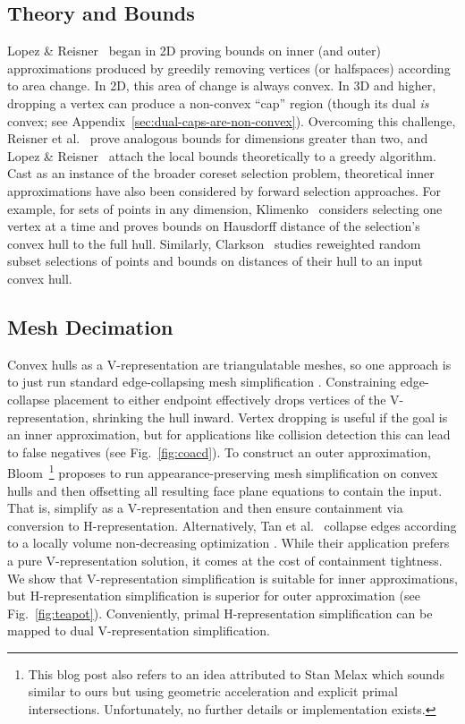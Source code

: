 \documentclass{egpubl}
\newcommand{\newhl}[1]{#1}
\newcommand{\Vrep}{V-representation\xspace}
\newcommand{\Hrep}{H-representation\xspace}
\begin{document}
\subsection{Theory and Bounds}
Lopez \& Reisner~\cite{LopezR00} began in 2D proving bounds on inner (and outer) approximations produced by greedily removing vertices (or halfspaces) according to area change.
In 2D, this area of change is always convex. In 3D and higher, dropping a vertex can produce a non-convex ``cap'' region (though its dual \emph{is} convex; see Appendix~\ref{sec:dual-caps-are-non-convex}). Overcoming this challenge, Reisner et al.~\cite{Reisner2001} prove analogous bounds for dimensions greater than two, and Lopez \& Reisner~\cite{LopezR02} attach the local bounds theoretically to a greedy algorithm.
Cast as an instance of the broader coreset selection problem, theoretical inner approximations have also been considered by forward selection approaches. \newhl{For example, for sets of points in any dimension, Klimenko~\cite{Klimenko23} considers selecting one vertex at a time and proves bounds on Hausdorff distance of the selection's convex hull to the full hull.
Similarly, Clarkson~\cite{ClarksonS89} studies reweighted random subset selections of points and bounds on distances of their hull to an input convex hull.}


\subsection{Mesh Decimation}
Convex hulls as a \Vrep are triangulatable meshes, so one approach is to just run standard edge-collapsing mesh simplification \cite{GarlandH97,Hoppe96}.
Constraining edge-collapse placement to either endpoint 
effectively drops vertices of the \Vrep,
 shrinking the hull inward.
 Vertex dropping is useful if the goal is an 
inner approximation, but for applications like collision detection this can lead to false negatives \cite{wei2022coacd} (see Fig.~\ref{fig:coacd}).
To construct an outer approximation, Bloom~\cite{bloom2011convexhull}\footnote{%
This blog post also refers to an idea attributed to Stan Melax
which sounds similar to ours but using geometric acceleration and explicit primal intersections. Unfortunately, no further details or implementation exists.} proposes to run appearance-preserving mesh simplification \cite{GarlandH97} on convex hulls and then offsetting all resulting face plane equations to contain the input. That is, simplify as a \Vrep and then ensure containment via conversion to \Hrep.
Alternatively, Tan et al.~\cite{TanLG17} collapse edges according to a locally volume non-decreasing optimization \cite{SanderGGHS00}. While their application prefers a pure \Vrep solution, it comes at the cost of containment tightness.
We show that \Vrep simplification is suitable for inner approximations, but \Hrep simplification is superior for outer approximation (see Fig.~\ref{fig:teapot}). Conveniently, primal \Hrep simplification can be mapped to dual \Vrep simplification.
\end{document}
